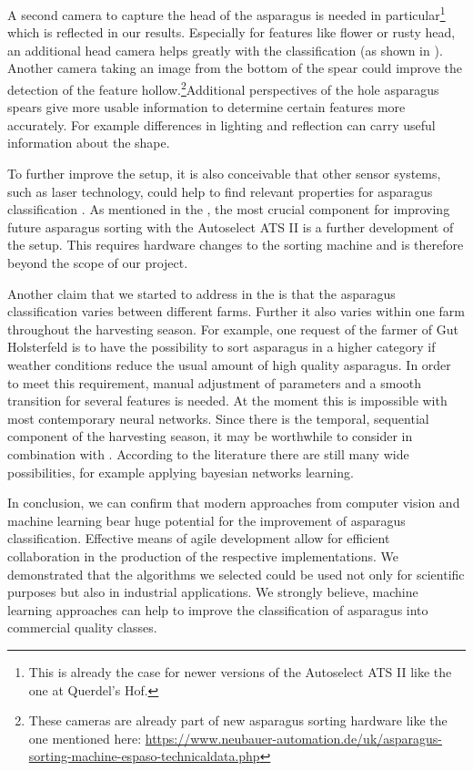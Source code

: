 A second camera to capture the head of the asparagus is needed in particular\footnote{This is already the case for newer versions of the Autoselect ATS II like the one at Querdel’s Hof.} which is reflected in our results. Especially for features like flower or rusty head, an additional head camera helps greatly with the classification (as shown in ). Another camera taking an image from the bottom of the spear could improve the detection of the feature hollow.\footnote{These cameras are already part of new asparagus sorting hardware like the one mentioned here: \url{https://www.neubauer-automation.de/uk/asparagus-sorting-machine-espaso-technicaldata.php}}Additional perspectives of the hole asparagus spears give more usable information to determine certain features more accurately. For example differences in lighting and reflection can carry useful information about the shape. 

To further improve the setup, it is also conceivable that other sensor systems, such as laser technology, could help to find relevant properties for asparagus classification \citep{bhargava2018fruits}. As mentioned in the , the most crucial component for improving future asparagus sorting with the Autoselect ATS II is a further development of the setup. This requires hardware changes to the sorting machine and is therefore beyond the scope of our project.

\bigskip
Another claim that we started to address in the 
is that the asparagus classification varies between different farms. Further it also varies within one farm throughout the harvesting season. For example, one request of the farmer of Gut Holsterfeld is to have the possibility to sort asparagus in a higher category if weather conditions reduce the usual amount of high quality asparagus. In order to meet this requirement, manual adjustment of parameters and a smooth transition for several features is needed. At the moment this is impossible with most contemporary neural networks. Since there is the temporal, sequential component of the harvesting season, it may be worthwhile to consider  in combination with  . According to the literature there are still many wide possibilities, for example applying bayesian networks learning.


\bigskip
In conclusion, we can confirm that modern approaches from computer vision and machine learning bear huge potential for the improvement of asparagus classification. Effective means of agile development allow for efficient collaboration in the production of the respective implementations. We demonstrated that the algorithms we selected could be used not only for scientific purposes but also in industrial applications. We strongly believe, machine learning approaches can help to improve the classification of asparagus into commercial quality classes.